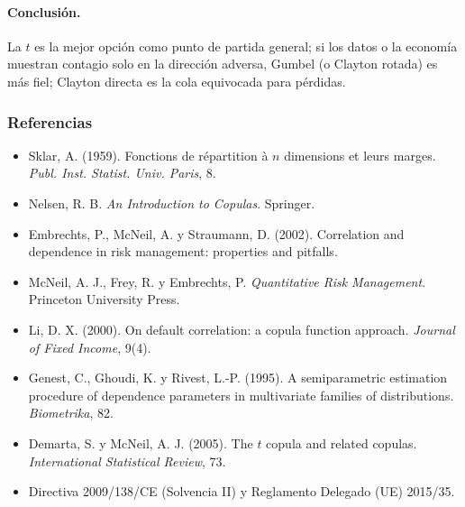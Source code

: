 \documentclass[a4paper,12pt]{article}
\begin{document}
\paragraph{Conclusión.} La $t$ es la mejor opción como punto de partida general; si los datos o la economía muestran contagio solo en la dirección adversa, Gumbel (o Clayton rotada) es más fiel; Clayton directa es la cola equivocada para pérdidas.

\subsubsection*{Referencias}
\begin{itemize}[leftmargin=*,itemsep=0pt]
\item Sklar, A. (1959). Fonctions de r\'epartition \`a $n$ dimensions et leurs marges. \emph{Publ. Inst. Statist. Univ. Paris}, 8.
\item Nelsen, R. B. \emph{An Introduction to Copulas}. Springer.
\item Embrechts, P., McNeil, A. y Straumann, D. (2002). Correlation and dependence in risk management: properties and pitfalls.
\item McNeil, A. J., Frey, R. y Embrechts, P. \emph{Quantitative Risk Management}. Princeton University Press.
\item Li, D. X. (2000). On default correlation: a copula function approach. \emph{Journal of Fixed Income}, 9(4).
\item Genest, C., Ghoudi, K. y Rivest, L.-P. (1995). A semiparametric estimation procedure of dependence parameters in multivariate families of distributions. \emph{Biometrika}, 82.
\item Demarta, S. y McNeil, A. J. (2005). The $t$ copula and related copulas. \emph{International Statistical Review}, 73.
\item Directiva 2009/138/CE (Solvencia II) y Reglamento Delegado (UE) 2015/35.
\end{itemize}
\end{document}

